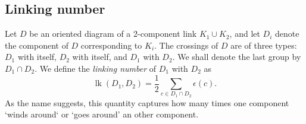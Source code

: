 \subsection{Linking number}

Let \(D\) be an oriented diagram of a \(2\)-component link \(K_1 \cup K_2\), and let \(D_i\) denote the component of \(D\) corresponding to \(K_i\). The crossings of \(D\) are of three types: \(D_1\) with itself, \(D_2\) with itself, and \(D_1\) with \(D_2\). We shall denote the last group by \(D_1 \cap D_2\). We define the \textit{linking number} of \(D_1\) with \(D_2\) as \[\operatorname{lk}(D_1, D_2) = \frac{1}{2} \sum_{c \in D_1 \cap D_2} \epsilon(c).\] As the name suggests, this quantity captures how many times one component `winds around` or `goes around' an other component.

